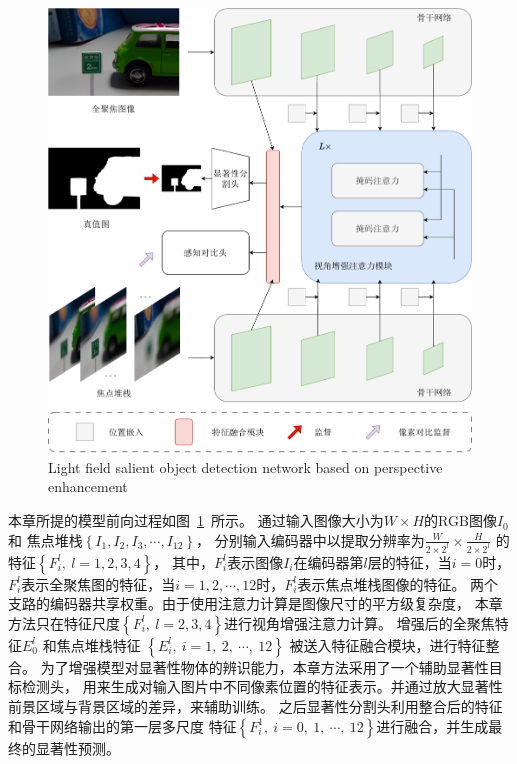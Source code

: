 % 
% 
%
%
%
%
%
\begin{figure}[!ht]
	\centering
	\includegraphics[width=0.95\linewidth]{figures/chapter4/chpt4_overview}
	{Light field salient object detection network based on perspective enhancement}  
	\label{cpt4_fig1:chpt4_overview}
\end{figure}
%
%
%
%
%
本章所提的模型前向过程如图~\ref{cpt4_fig1:chpt4_overview}~所示。
通过输入图像大小为$W \times H$的RGB图像$I_{0}$和
焦点堆栈$\left \{  I_{1},I_{2},I_{3},\cdots,I_{12} \right \} $，
分别输入编码器中以提取分辨率为$\frac{W}{2 \times 2^{l}} \times \frac{H}{2  \times 2^{l}} $ 
的特征$\left \{ F_{i}^{l},~l=1,2,3,4 \right \}$，
其中，$F_{i}^{l}$表示图像$I_{i}$在编码器第$l$层的特征，当$i=0$时，
$F_{i}^{l}$表示全聚焦图的特征，当$i=1,2,\cdots,12$时，$F_{i}^{l}$表示焦点堆栈图像的特征。
两个支路的编码器共享权重。由于使用注意力计算是图像尺寸的平方级复杂度，
本章方法只在特征尺度$\left \{ F_{i}^{l},~ l = 2, 3, 4\right \}$进行视角增强注意力计算。
增强后的全聚焦特征$ E_{0}^{l} $ 和焦点堆栈特征 $\left \{ E_{i}^{l},~i=1,~2,~ \cdots,~12 \right \}$
被送入特征融合模块，进行特征整合。
为了增强模型对显著性物体的辨识能力，本章方法采用了一个辅助显著性目标检测头，
用来生成对输入图片中不同像素位置的特征表示。并通过放大显著性前景区域与背景区域的差异，来辅助训练。
之后显著性分割头利用整合后的特征和骨干网络输出的第一层多尺度
特征$\left \{ F_{i}^{1},~i=0,~1,~ \cdots, ~12 \right \}$进行融合，并生成最终的显著性预测。
%
%
%
%
%
%
%
%
%
%
\\

